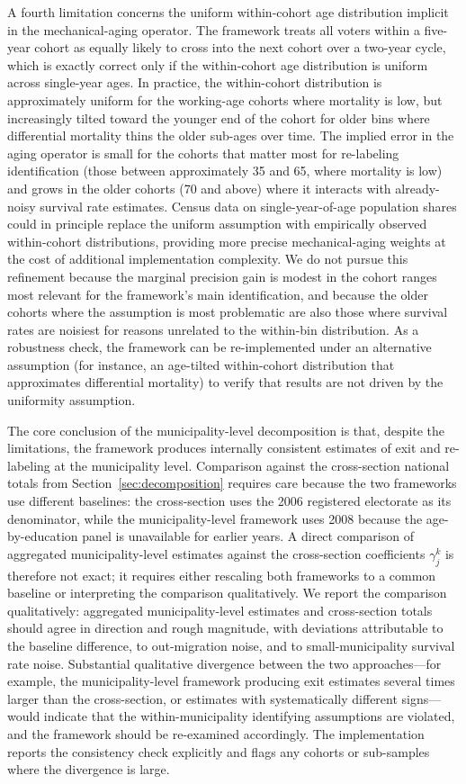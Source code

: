 A fourth limitation concerns the uniform within-cohort age distribution implicit in the mechanical-aging operator. The framework treats all voters within a five-year cohort as equally likely to cross into the next cohort over a two-year cycle, which is exactly correct only if the within-cohort age distribution is uniform across single-year ages. In practice, the within-cohort distribution is approximately uniform for the working-age cohorts where mortality is low, but increasingly tilted toward the younger end of the cohort for older bins where differential mortality thins the older sub-ages over time. The implied error in the aging operator is small for the cohorts that matter most for re-labeling identification (those between approximately 35 and 65, where mortality is low) and grows in the older cohorts (70 and above) where it interacts with already-noisy survival rate estimates. Census data on single-year-of-age population shares could in principle replace the uniform assumption with empirically observed within-cohort distributions, providing more precise mechanical-aging weights at the cost of additional implementation complexity. We do not pursue this refinement because the marginal precision gain is modest in the cohort ranges most relevant for the framework's main identification, and because the older cohorts where the assumption is most problematic are also those where survival rates are noisiest for reasons unrelated to the within-bin distribution. As a robustness check, the framework can be re-implemented under an alternative assumption (for instance, an age-tilted within-cohort distribution that approximates differential mortality) to verify that results are not driven by the uniformity assumption.

The core conclusion of the municipality-level decomposition is that, despite the limitations, the framework produces internally consistent estimates of exit and re-labeling at the municipality level. Comparison against the cross-section national totals from Section~\ref{sec:decomposition} requires care because the two frameworks use different baselines: the cross-section uses the 2006 registered electorate as its denominator, while the municipality-level framework uses 2008 because the age-by-education panel is unavailable for earlier years. A direct comparison of aggregated municipality-level estimates against the cross-section coefficients $\gamma_j^k$ is therefore not exact; it requires either rescaling both frameworks to a common baseline or interpreting the comparison qualitatively. We report the comparison qualitatively: aggregated municipality-level estimates and cross-section totals should agree in direction and rough magnitude, with deviations attributable to the baseline difference, to out-migration noise, and to small-municipality survival rate noise. Substantial qualitative divergence between the two approaches---for example, the municipality-level framework producing exit estimates several times larger than the cross-section, or estimates with systematically different signs---would indicate that the within-municipality identifying assumptions are violated, and the framework should be re-examined accordingly. The implementation reports the consistency check explicitly and flags any cohorts or sub-samples where the divergence is large.
